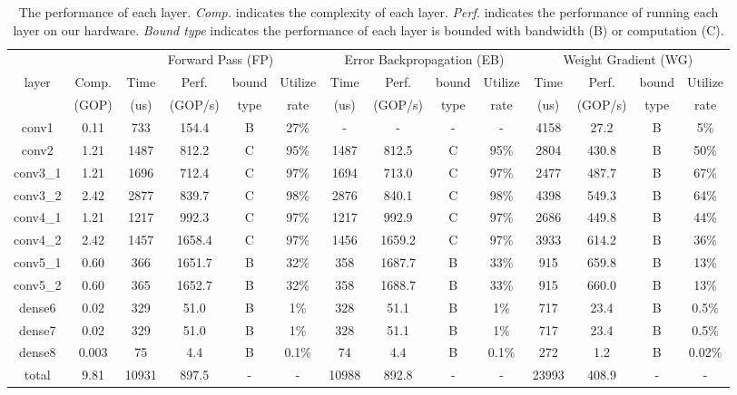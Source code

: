 
\begin{table*}[tb]
    \centering
    \caption{The performance of each layer. \textit{Comp.} indicates the complexity of each layer. \textit{Perf.} indicates the performance of running each layer on our hardware. \textit{Bound type} indicates the performance of each layer is bounded with bandwidth (B) or computation (C).}
    \begin{tabular}{c|c|cccc|cccc|cccc}  \toprule
        &       & \multicolumn{4}{c|}{Forward Pass (FP)}  & \multicolumn{4}{c|}{Error Backpropagation (EB)} & \multicolumn{4}{c}{Weight Gradient (WG)} \\
  \cline{2-14}layer & Comp. & Time  & Perf. & bound & Utilize & Time  & Perf. & bound & Utilize & Time  & Perf. & bound & Utilize \\
        & (GOP) & (us)  & (GOP/s) & type  & rate  & (us)  & (GOP/s) & type  & rate  & (us)  & (GOP/s) & type  & rate \\
  \hline
  conv1 & 0.11  & 733   & 154.4  & B     & 27\%  & -     & -     & -     & -     & 4158  & 27.2  & B     & 5\% \\
  conv2 & 1.21  & 1487  & 812.2  & C     & 95\%  & 1487  & 812.5  & C     & 95\%  & 2804  & 430.8  & B     & 50\% \\
  conv3\_1 & 1.21  & 1696  & 712.4  & C     & 97\%  & 1694  & 713.0  & C     & 97\%  & 2477  & 487.7  & B     & 67\% \\
  conv3\_2 & 2.42  & 2877  & 839.7  & C     & 98\%  & 2876  & 840.1  & C     & 98\%  & 4398  & 549.3  & B     & 64\% \\
  conv4\_1 & 1.21  & 1217  & 992.3  & C     & 97\%  & 1217  & 992.9  & C     & 97\%  & 2686  & 449.8  & B     & 44\% \\
  conv4\_2 & 2.42  & 1457  & 1658.4  & C     & 97\%  & 1456  & 1659.2  & C     & 97\%  & 3933  & 614.2  & B     & 36\% \\
  conv5\_1 & 0.60  & 366   & 1651.7  & B     & 32\%  & 358   & 1687.7  & B     & 33\%  & 915   & 659.8  & B     & 13\% \\
  conv5\_2 & 0.60  & 365   & 1652.7  & B     & 32\%  & 358   & 1688.7  & B     & 33\%  & 915   & 660.0  & B     & 13\% \\
  dense6 & 0.02  & 329   & 51.0  & B     & 1\%   & 328   & 51.1  & B     & 1\%   & 717   & 23.4  & B     & 0.5\% \\
  dense7 & 0.02  & 329   & 51.0  & B     & 1\%   & 328   & 51.1  & B     & 1\%   & 717   & 23.4  & B     & 0.5\% \\
  dense8 & 0.003  & 75    & 4.4   & B     & 0.1\% & 74    & 4.4   & B     & 0.1\% & 272   & 1.2   & B     & 0.02\% \\
  \hline
  total & 9.81  & 10931  & 897.5  & -     & -     & 10988  & 892.8  & -     & -     & 23993  & 408.9  & -     & - \\
  \bottomrule
  \end{tabular}%
    \label{tab:layerperformance}%
  \end{table*}%